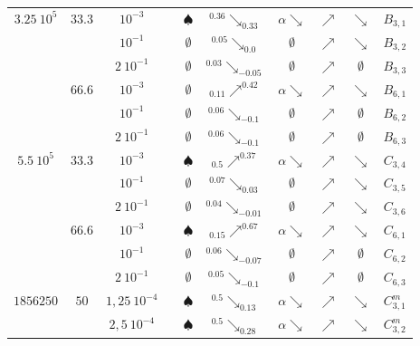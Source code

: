 \begin{table}[htbp]
\begin{tabular}{|c|c|c|c|c|c|c|c|c|c|}
			\hline
			\hline \multirow{6}{*}{$3.25\ 10^5$} & \multirow{3}{*}{$33.3$}
					& $10^{-3}$ & \accretionlot{} & $\spadesuit$ & ${}^{0.36}\searrow_{0.33}$ & $\alpha\searrow$ & $\nearrow$ & $\searrow$ & $B_{3,1}$  \tabularnewline \cline{3-10}
					& & $10^{-1}$ & \accretionpeu{} & $\emptyset$ & ${}^{0.05}\searrow_{0.0}$ & $\emptyset$ & $\nearrow$ & $\searrow$ & $B_{3,2}$  \tabularnewline \cline{3-10}
					& & $2\ 10^{-1}$ & \accretionpeu{} & $\emptyset$ & ${}^{0.03}\searrow_{-0.05}$ & $\emptyset$ & $\nearrow$ & $\emptyset$ & $B_{3,3}$  \tabularnewline \cline{2-10}
				& \multirow{3}{*}{$66.6$}
					& $10^{-3}$ & \accretionpeu{} & $\emptyset$ & ${}_{0.11}\nearrow^{0.42}$ & $\alpha\searrow$ & $\nearrow$ & $\searrow$ & $B_{6,1}$  \tabularnewline \cline{3-10}
					& & $10^{-1}$ & \accretionpeu{} & $\emptyset$ & ${}^{0.06}\searrow_{-0.1}$ & $\emptyset$ & $\nearrow$ & $\emptyset$ & $B_{6,2}$  \tabularnewline \cline{3-10}
					& & $2\ 10^{-1}$ & \accretionpeu{} & $\emptyset$ & ${}^{0.06}\searrow_{-0.1}$ & $\emptyset$ & $\nearrow$ & $\emptyset$ & $B_{6,3}$  \tabularnewline \cline{2-10}
			\hline
			\hline \multirow{6}{*}{$5.5\ 10^5$} & \multirow{3}{*}{$33.3$}
					& $10^{-3}$ & \accretionlot{} & $\spadesuit$ & ${}_{0.5}\nearrow^{0.37}$ & $\alpha\searrow$ & $\nearrow$ & $\searrow$ & $C_{3,4}$  \tabularnewline \cline{3-10}
					& & $10^{-1}$ & \accretionlot{} & $\emptyset$ & ${}^{0.07}\searrow_{0.03}$ & $\emptyset$ & $\nearrow$ & $\searrow$ & $C_{3,5}$  \tabularnewline \cline{3-10}
					& & $2\ 10^{-1}$ & \accretionpeu{} & $\emptyset$ & ${}^{0.04}\searrow_{-0.01}$ & $\emptyset$ & $\nearrow$ & $\searrow$ & $C_{3,6}$  \tabularnewline \cline{2-10}
				& \multirow{3}{*}{$66.6$}
					& $10^{-3}$ & \accretionmoyen{} & $\spadesuit$ & ${}_{0.15}\nearrow^{0.67}$ & $\alpha\searrow$ & $\nearrow$ & $\searrow$ & $C_{6,1}$  \tabularnewline \cline{3-10}
					& & $10^{-1}$ & \accretionpeu{} & $\emptyset$ & ${}^{0.06}\searrow_{-0.07}$ & $\emptyset$ & $\nearrow$ & $\emptyset$ & $C_{6,2}$  \tabularnewline \cline{3-10}
					& & $2\ 10^{-1}$ & \accretionpeu{} & $\emptyset$ & ${}^{0.05}\searrow_{-0.1}$ & $\emptyset$ & $\nearrow$ & $\emptyset$ & $C_{6,3}$  \tabularnewline \cline{2-10}
			\hline
			\hline \multirow{6}{*}{$1856250$} & \multirow{6}{*}{$50$}
					& $1,25\ 10^{-4}$ & \accretionlot{} & $\spadesuit$ & ${}^{0.5}\searrow_{0.13}$ & $\alpha\searrow$ & $\nearrow$ & $\searrow$ & $C_{3,1}^m$  \tabularnewline \cline{3-10}
					& & $2,5\ 10^{-4}$ & \accretionlot{} & $\spadesuit$ & ${}^{0.5}\searrow_{0.28}$ & $\alpha\searrow$ & $\nearrow$ & $\searrow$ & $C_{3,2}^m$  \tabularnewline \cline{3-10}

\end{tabular}
\end{table}
